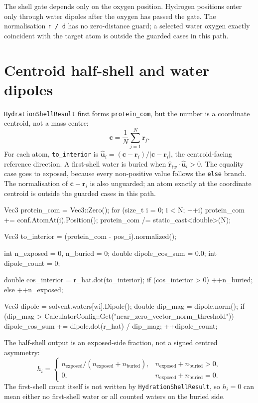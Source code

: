 \documentclass[11pt]{article}
\newcommand{\code}[1]{\texttt{#1}}
\begin{document}
The shell gate depends only on the oxygen position. Hydrogen positions enter
only through water dipoles after the oxygen has passed the gate. The
normalisation \code{r / d} has no zero-distance guard; a selected water oxygen
exactly coincident with the target atom is outside the guarded cases in this
path.

\section{Centroid half-shell and water dipoles}

\code{HydrationShellResult} first forms \code{protein\_com}, but the number is a
coordinate centroid, not a mass centre:
\[
  \bm c = \frac{1}{N}\sum_{j=1}^N \bm r_j .
\]
For each atom, \code{to\_interior} is
\(\hat{\bm u}_i=(\bm c-\bm r_i)/|\bm c-\bm r_i|\), the centroid-facing reference
direction. A first-shell water is buried when
\(\hat{\bm r}_{iw}\cdot\hat{\bm u}_i>0\). The equality case goes to exposed,
because every non-positive value follows the \code{else} branch. The
normalisation of \(\bm c-\bm r_i\) is also unguarded; an atom exactly at the
coordinate centroid is outside the guarded cases in this path.

\begin{codebox}
Vec3 protein_com = Vec3::Zero();
for (size_t i = 0; i < N; ++i)
    protein_com += conf.AtomAt(i).Position();
protein_com /= static_cast<double>(N);

Vec3 to_interior = (protein_com - pos_i).normalized();

int n_exposed = 0, n_buried = 0;
double dipole_cos_sum = 0.0;
int dipole_count = 0;

double cos_interior = r_hat.dot(to_interior);
if (cos_interior > 0)
    ++n_buried;
else
    ++n_exposed;

Vec3 dipole = solvent.waters[wi].Dipole();
double dip_mag = dipole.norm();
if (dip_mag > CalculatorConfig::Get("near_zero_vector_norm_threshold")) {
    dipole_cos_sum += dipole.dot(r_hat) / dip_mag;
    ++dipole_count;
}
\end{codebox}

The half-shell output is an exposed-side fraction, not a signed centred
asymmetry:
\[
  h_i =
  \begin{cases}
  n_{\mathrm{exposed}}/(n_{\mathrm{exposed}}+n_{\mathrm{buried}}),
    & n_{\mathrm{exposed}}+n_{\mathrm{buried}}>0,\\
  0, & n_{\mathrm{exposed}}+n_{\mathrm{buried}}=0 .
  \end{cases}
\]
The first-shell count itself is not written by \code{HydrationShellResult}, so
\(h_i=0\) can mean either no first-shell water or all counted waters on the
buried side.
\end{document}

